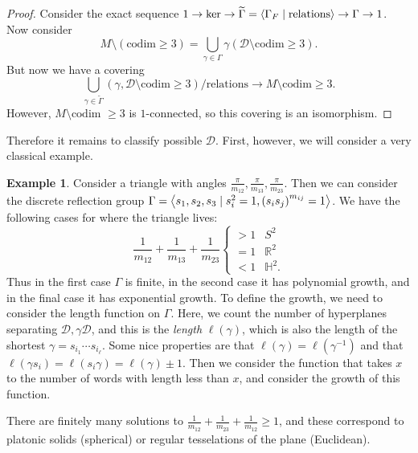 \documentclass[leqno, openany]{memoir}
\theoremstyle{definition}
\newtheorem{exm}[thm]{Example}
\theoremstyle{remark}
\theoremstyle{plain}
\theoremstyle{definition}
\theoremstyle{remark}
\newcommand{\R}{\mathbb{R}}
\renewcommand{\H}{\mathbb{H}}
\newcommand{\mc}[1]{\mathcal{#1}}
\newcommand{\wtl}[1]{\widetilde{#1}}
\begin{document}
\begin{proof}
    Consider the exact sequence $1 \to \ker \to \wtl{\Gamma} = \ev{\Gamma_F \mid \text{relations}} \to \Gamma \to 1$. Now consider 
    \[ M \setminus ( \text{codim}\geq 3 ) = \bigcup_{\gamma \in \Gamma} \gamma(\mc{D} \setminus \text{codim} \geq 3). \]
    But now we have a covering
    \[ \bigcup_{\gamma \in \wtl{\Gamma}} (\gamma, \mc{D} \setminus \text{codim}\geq 3) / \text{relations} \to M \setminus \text{codim}\geq 3. \]
    However, $M \setminus \text{codim }\geq 3$ is $1$-connected, so this covering is an isomorphism.
\end{proof}

Therefore it remains to classify possible $\mc{D}$. First, however, we will consider a very classical example.

\begin{exm}
    Consider a triangle with angles $\frac{\pi}{m_{12}}, \frac{\pi}{m_{13}}, \frac{\pi}{m_{23}}$. 
    Then we can consider the discrete reflection group $\Gamma = \ev{s_1, s_2, s_3 \mid s_i^2 = 1, {(s_i s_j)}^{m_{ij}} = 1}$. We have the following cases for where the triangle lives:
    \[ \frac{1}{m_{12}} + \frac{1}{m_{13}} + \frac{1}{m_{23}} \begin{cases}
        > 1 & S^2 \\
        = 1 & \R^2 \\
        < 1 & \H^2.
    \end{cases} \]
    Thus in the first case $\Gamma$ is finite, in the second case it has polynomial growth, and in the final case it has exponential growth. To define the growth, we need to consider the length function on $\Gamma$. Here, we count the number of hyperplanes separating $\mc{D}, \gamma \mc{D}$, and this is the \textit{length} $\ell(\gamma)$, which is also the length of the shortest $\gamma = s_{i_1} \cdots s_{i_{\ell}}$. Some nice properties are that $\ell(\gamma) = \ell(\gamma^{-1})$ and that $\ell(\gamma s_i) = \ell(s_i \gamma) = \ell(\gamma) \pm 1$. Then we consider the function that takes $x$ to the number of words with length less than $x$, and consider the growth of this function.

    There are finitely many solutions to $\frac{1}{m_{12}} + \frac{1}{m_{23}} + \frac{1}{m_{12}} \geq 1$, and these correspond to platonic solids (spherical) or regular tesselations of the plane (Euclidean).
\end{exm}
\end{document}
